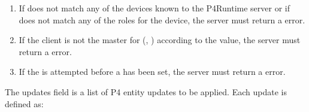 \documentclass[11pt]{article}
\begin{document}
{%
\begin{enumerate}%

\item{}
If  does not match any of the devices known to the P4Runtime
server or if  does not match any of the roles for the device, the
server must return a  error.%

\item{}
If the client is not the master for (, ) according to the
 value, the server must return a  error.%

\item{}
If the  is attempted before a  has been set,
the server must return a  error.%
\end{enumerate}%

\noindent{}The updates field is a list of P4 entity updates to be applied. Each update is
defined as:%

}
\end{document}
